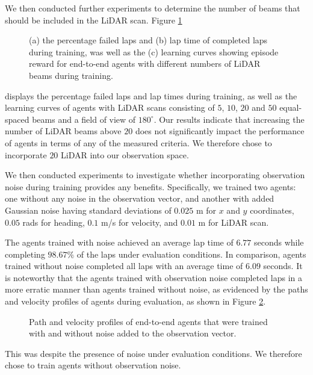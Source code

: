 We then conducted further experiments to determine the number of beams that should be included in the LiDAR scan. 
Figure \ref{fig:n_beams} 
\begin{figure}[htb!]
    \centering
    
    \caption[Learning curves of agents with different numbers of LiDAR beams during training]{(a) the percentage failed laps and (b) lap time of completed laps during training, was well as the (c) learning curves showing episode reward for end-to-end agents with different numbers of LiDAR beams during training.}
    \label{fig:n_beams}
\end{figure}
displays the percentage failed laps and lap times during training, as well as the learning curves of agents with LiDAR scans consisting of $5$, $10$, $20$ and $50$ equal-spaced beams and a field of view of $180^{\circ}$.
Our results indicate that increasing the number of LiDAR beams above $20$ does not significantly impact the performance of agents in terms of any of the measured criteria. 
We therefore chose to incorporate $20$ LiDAR into our observation space.


We then conducted experiments to investigate whether incorporating observation noise during training provides any benefits. 
Specifically, we trained two agents: one without any noise in the observation vector, and another with added Gaussian noise having standard deviations of $0.025$ m for $x$ and $y$ coordinates, $0.05$ rads for heading, $0.1$ m/s for velocity, and $0.01$ m for LiDAR scan.

The agents trained with noise achieved an average lap time of $6.77$ seconds while completing $98.67\%$ of the laps under evaluation conditions. 
In comparison, agents trained without noise completed all laps with an average time of $6.09$ seconds.
It is noteworthy that the agents trained with observation noise completed laps in a more erratic manner than agents trained without noise, as evidenced by the paths and velocity profiles of agents during evaluation, as shown in Figure \ref{fig:noise_lap}.
\begin{figure}[htb!]
    \centering
    
    \caption[Path and velocity profiles of end-to-end agents that were trained with and without noise added to the observation vector]{Path and velocity profiles of end-to-end agents that were trained with and without noise added to the observation vector.}
    \label{fig:noise_lap}
\end{figure}
This was despite the presence of noise under evaluation conditions.
We therefore chose to train agents without observation noise.



